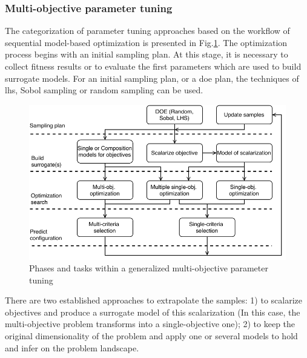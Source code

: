         
        \subsubsection{Multi-objective parameter tuning}

            The categorization of parameter tuning approaches based on the workflow of sequential model-based optimization is presented in Fig.\ref{fig:mo_param_tuning}. The optimization process begins with an initial sampling plan. At this stage, it is necessary to collect fitness results or to evaluate the first parameters which are used to build surrogate models. For an initial sampling plan, or a \gls{doe} plan, the techniques of \gls{lhs}, Sobol sampling or random sampling can be used.
            
            \begin{figure} 
                \centering
                \includegraphics[width=\textwidth]{content/images/tax_mb_tuning}
                \caption[Phases and tasks within a generalized multi-objective parameter tuning]{Phases and tasks within a generalized multi-objective parameter tuning}
                \label{fig:mo_param_tuning}
            \end{figure}

            There are two established approaches to extrapolate the samples: 1) to scalarize objectives and produce a surrogate model of this scalarization (In this case, the multi-objective problem transforms into a single-objective one); 2) to keep the original dimensionality of the problem and apply one or several models to hold and infer on the problem landscape.

